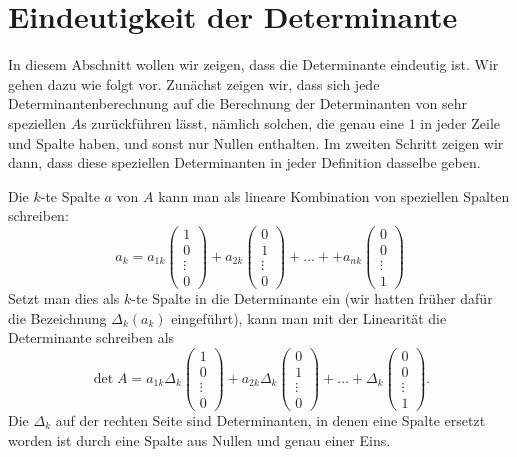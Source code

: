 %
%
%
\section{Eindeutigkeit der Determinante\label{deteindeutig}}
In diesem Abschnitt wollen wir zeigen, dass die Determinante
eindeutig ist.
Wir gehen dazu wie folgt vor.
Zunächst zeigen wir,
dass sich jede Determinantenberechnung auf die Berechnung der Determinanten
von sehr speziellen $A$s zurückführen lässt, nämlich solchen,
die genau eine $1$ in jeder Zeile und Spalte haben, und sonst nur
Nullen enthalten.
Im zweiten Schritt zeigen wir dann, dass diese
speziellen Determinanten in jeder Definition dasselbe geben.

Die $k$-te Spalte $a$ von $A$ kann man als lineare Kombination von
speziellen Spalten schreiben:
\[
a_k=a_{1k}
\begin{pmatrix}
1\\0\\\vdots\\0
\end{pmatrix}
+a_{2k}
\begin{pmatrix}
0\\1\\\vdots\\0
\end{pmatrix}
+\dots+
+a_{nk}
\begin{pmatrix}
0\\0\\\vdots\\1
\end{pmatrix}
\]
Setzt man dies als $k$-te Spalte in die Determinante ein (wir hatten früher
dafür die Bezeichnung $\Delta_k(a_k)$ eingeführt), kann man mit
der Linearität  die Determinante schreiben als
\[
\det A=a_{1k}\Delta_k\left(
\begin{matrix}
1\\0\\\vdots\\0
\end{matrix}
\right)
+a_{2k}
\Delta_k\left(
\begin{matrix}
0\\1\\\vdots\\0
\end{matrix}
\right)+\dots+
\Delta_k\left(
\begin{matrix}
0\\0\\\vdots\\1
\end{matrix}
\right).
\]
Die $\Delta_k$ auf der rechten Seite sind Determinanten, in denen 
eine Spalte ersetzt worden ist durch eine Spalte aus Nullen und genau
einer Eins.

